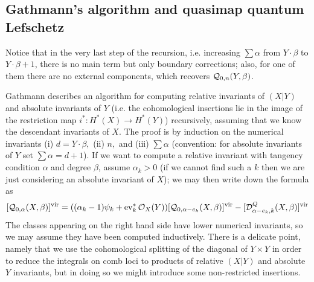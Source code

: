 \subsection{Gathmann's algorithm and quasimap quantum Lefschetz} Notice that in the very last step of the recursion, i.e. increasing $\sum\alpha$ from $Y\cdot \beta$ to $Y\cdot \beta+1$, there is no main term but only boundary corrections; also, for one of them there are no external components, which recovers $\mathcal{Q}_{0,n}(Y,\beta)$.

Gathmann describes an algorithm for computing relative invariants of $(X|Y)$ and  absolute invariants of $Y$ (i.e. the cohomological insertions lie in the image of the restriction map $i^*\colon H^*(X)\to H^*(Y)$) recursively, assuming that we know the descendant invariants of $X$. The proof is by induction on the numerical invariants (i) $d=Y\cdot \beta,$ (ii) $n,$ and (iii) $\sum\alpha$ (convention: for absolute invariants of $Y$ set $\sum\alpha=d+1$). If we want to compute a relative invariant with tangency condition $\alpha$ and degree $\beta$, assume $\alpha_k>0$ (if we cannot find such a $k$ then we are just considering an absolute invariant of $X$); we may then write down the formula as
\[[\mathcal{Q}_{0,\alpha}(X,\beta)]^{\mathrm{vir}}=((\alpha_k-1)\psi_k+\operatorname{ev}_k^*\mathcal{O}_X(Y))[\mathcal{Q}_{0,\alpha-e_k}(X,\beta)]^{\mathrm{vir}}-[\mathcal{D}^Q_{\alpha-e_k,k}(X,\beta)]^{\mathrm{vir}}\]
The classes appearing on the right hand side have lower numerical invariants, so we may assume they have been computed inductively. There is a delicate point, namely that we use the cohomological splitting of the diagonal of $Y\times Y$ in order to reduce the integrals on comb loci to products of relative $(X|Y)$ and absolute $Y$ invariants, but in doing so we might introduce some non-restricted insertions.

